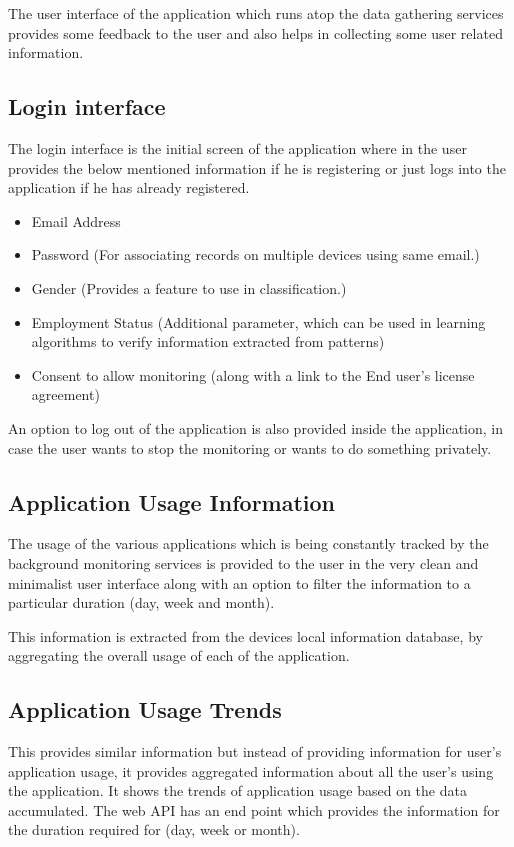 \documentclass[12pt]{report}
\begin{document}
The user interface of the application which runs atop the data gathering services provides some feedback to the user and also helps in collecting some user related information.

\subsection{Login interface}

The login interface is the initial screen of the application where in the user provides the below mentioned information if he is registering or just logs into the application if he has already registered.
\begin{itemize}
\item Email Address
\item Password (For associating records on multiple devices using same email.)
\item Gender (Provides a feature to use in classification.)
\item Employment Status (Additional parameter, which can be used in learning algorithms to verify information extracted from patterns)
\item Consent to allow monitoring (along with a link to the End user's license agreement)
\end{itemize}

An option to log out of the application is also provided inside the application, in case the user wants to stop the monitoring or wants to do something privately.


\subsection{Application Usage Information}

The usage of the various applications which is being constantly tracked by the background monitoring services is provided to the user in the very clean and minimalist user interface along with an option to filter the information to a particular duration (day, week and month).

This information is extracted from the devices local information database, by aggregating the overall usage of each of the application.

\subsection{Application Usage Trends}

This provides similar information but instead of providing information for user's application usage, it provides aggregated information about all the user's using the application. It shows the trends of application usage based on the data accumulated. The web API has an end point which provides the information for the duration required for (day, week or month).
\end{document}
